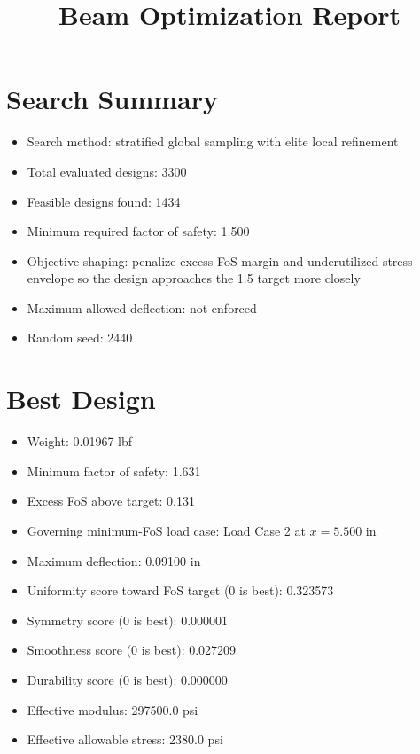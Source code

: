 \documentclass[11pt]{article}
\title{Beam Optimization Report}
\date{}
\begin{document}
\maketitle

\section*{Search Summary}
\begin{itemize}
\item Search method: stratified global sampling with elite local refinement
\item Total evaluated designs: 3300
\item Feasible designs found: 1434
\item Minimum required factor of safety: 1.500
\item Objective shaping: penalize excess FoS margin and underutilized stress envelope so the design approaches the 1.5 target more closely
\item Maximum allowed deflection: not enforced
\item Random seed: 2440
\end{itemize}

\section*{Best Design}
\begin{itemize}
\item Weight: 0.01967 lbf
\item Minimum factor of safety: 1.631
\item Excess FoS above target: 0.131
\item Governing minimum-FoS load case: Load Case 2 at $x=5.500$ in
\item Maximum deflection: 0.09100 in
\item Uniformity score toward FoS target (0 is best): 0.323573
\item Symmetry score (0 is best): 0.000001
\item Smoothness score (0 is best): 0.027209
\item Durability score (0 is best): 0.000000
\item Effective modulus: 297500.0 psi
\item Effective allowable stress: 2380.0 psi
\end{itemize}
\end{document}
